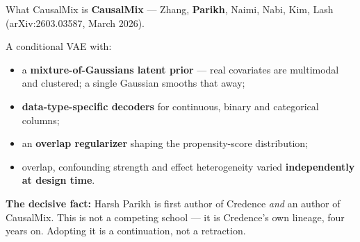 \documentclass[aspectratio=169]{beamer}
\begin{document}
\begin{frame}{What CausalMix is}
  \small
  \textbf{CausalMix} --- Zhang, \textbf{Parikh}, Naimi, Nabi, Kim, Lash
  (arXiv:2603.03587, March 2026).

  \vspace{0.5em}
  A conditional VAE with:
  \begin{itemize}
    \item a \textbf{mixture-of-Gaussians latent prior} --- real covariates are
          multimodal and clustered; a single Gaussian smooths that away;
    \item \textbf{data-type-specific decoders} for continuous, binary and categorical
          columns;
    \item an \textbf{overlap regularizer} shaping the propensity-score distribution;
    \item overlap, confounding strength and effect heterogeneity varied
          \textbf{independently at design time}.
  \end{itemize}

  \vspace{0.6em}
  \textcolor{accent}{\textbf{The decisive fact:}} Harsh Parikh is first author of
  Credence \emph{and} an author of CausalMix. This is not a competing school --- it is
  Credence's own lineage, four years on. Adopting it is a continuation, not a retraction.
\end{frame}
\end{document}
